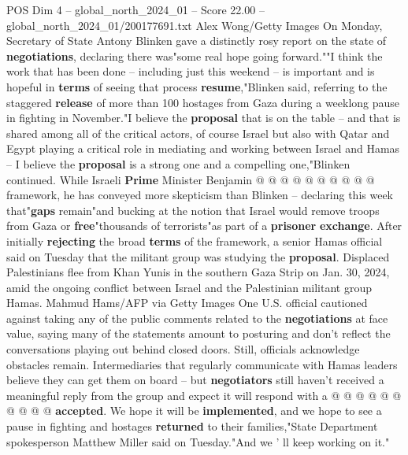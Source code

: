 \begin{textsample}{POS Dim 4 – global\_north\_2024\_01 – Score 22.00 – global\_north\_2024\_01/200177691.txt}
Alex Wong/Getty Images On Monday, Secretary of State Antony Blinken gave a distinctly rosy report on the state of \textbf{negotiations}, declaring there was"some real hope going forward.""I think the work that has been done -- including just this weekend -- is important and is hopeful in \textbf{terms} of seeing that process \textbf{resume},"Blinken said, referring to the staggered \textbf{release} of more than 100 hostages from Gaza during a weeklong pause in fighting in November."I believe the \textbf{proposal} that is on the table -- and that is shared among all of the critical actors, of course Israel but also with Qatar and Egypt playing a critical role in mediating and working between Israel and Hamas -- I believe the \textbf{proposal} is a strong one and a compelling one,"Blinken continued.
While Israeli \textbf{Prime} Minister Benjamin @ @ @ @ @ @ @ @ @ @ framework, he has conveyed more skepticism than Blinken -- declaring this week that"\textbf{gaps} remain"and bucking at the notion that Israel would remove troops from Gaza or \textbf{free}"thousands of terrorists"as part of a \textbf{prisoner} \textbf{exchange}.
After initially \textbf{rejecting} the broad \textbf{terms} of the framework, a senior Hamas official said on Tuesday that the militant group was studying the \textbf{proposal}.
Displaced Palestinians flee from Khan Yunis in the southern Gaza Strip on Jan. 30, 2024, amid the ongoing conflict between Israel and the Palestinian militant group Hamas.
Mahmud Hams/AFP via Getty Images One U.S. official cautioned against taking any of the public comments related to the \textbf{negotiations} at face value, saying many of the statements amount to posturing and don't reflect the conversations playing out behind closed doors.
Still, officials acknowledge obstacles remain.
Intermediaries that regularly communicate with Hamas leaders believe they can get them on board -- but \textbf{negotiators} still haven't received a meaningful reply from the group and expect it will respond with a @ @ @ @ @ @ @ @ @ @ \textbf{accepted}.
We hope it will be \textbf{implemented}, and we hope to see a pause in fighting and hostages \textbf{returned} to their families,"State Department spokesperson Matthew Miller said on Tuesday."And we ' ll keep working on it."

\end{textsample}

